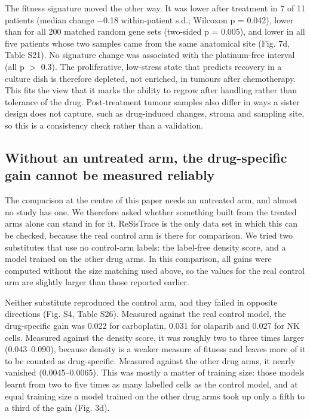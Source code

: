 \documentclass[11pt,a4paper]{article}
\begin{document}
The fitness signature moved the other way. It was lower after treatment in 7 of 11 patients (median change $-$0.18 within-patient s.d.; Wilcoxon p = 0.042), lower than for all 200 matched random gene sets (two-sided p = 0.005), and lower in all five patients whose two samples came from the same anatomical site (Fig. 7d, Table S21). No signature change was associated with the platinum-free interval (all p $>$ 0.3). The proliferative, low-stress state that predicts recovery in a culture dish is therefore depleted, not enriched, in tumours after chemotherapy. This fits the view that it marks the ability to regrow after handling rather than tolerance of the drug. Post-treatment tumour samples also differ in ways a sister design does not capture, such as drug-induced changes, stroma and sampling site, so this is a consistency check rather than a validation.

\subsection*{Without an untreated arm, the drug-specific gain cannot be measured reliably}

The comparison at the centre of this paper needs an untreated arm, and almost no study has one. We therefore asked whether something built from the treated arms alone can stand in for it. ReSisTrace is the only data set in which this can be checked, because the real control arm is there for comparison. We tried two substitutes that use no control-arm labels: the label-free density score, and a model trained on the other drug arms. In this comparison, all gains were computed without the size matching used above, so the values for the real control arm are slightly larger than those reported earlier.

Neither substitute reproduced the control arm, and they failed in opposite directions (Fig. S4, Table S26). Measured against the real control model, the drug-specific gain was 0.022 for carboplatin, 0.031 for olaparib and 0.027 for NK cells. Measured against the density score, it was roughly two to three times larger (0.043--0.090), because density is a weaker measure of fitness and leaves more of it to be counted as drug-specific. Measured against the other drug arms, it nearly vanished (0.0045--0.0065). This was mostly a matter of training size: those models learnt from two to five times as many labelled cells as the control model, and at equal training size a model trained on the other drug arms took up only a fifth to a third of the gain (Fig. 3d).
\end{document}
